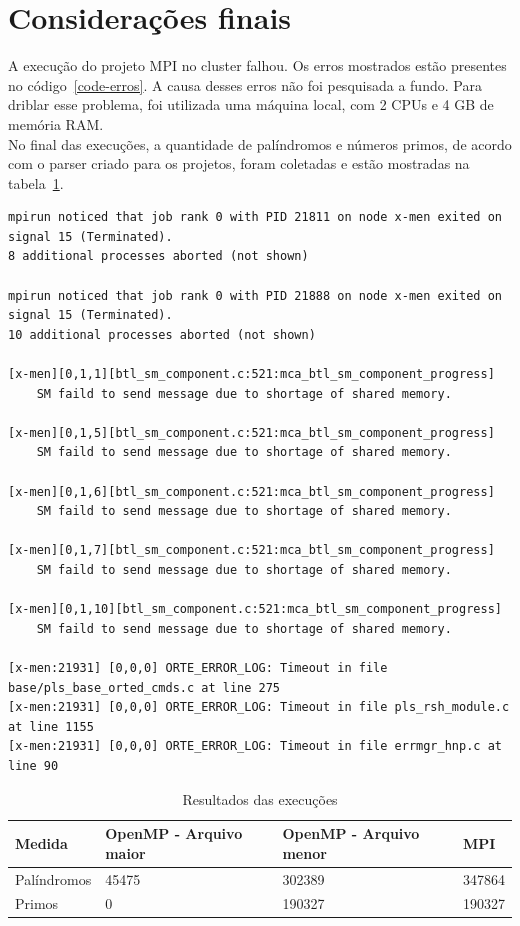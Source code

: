 \documentclass[a4paper]{article}
\begin{document}
\section{Considerações finais}
\indent \indent A execução do projeto MPI no cluster falhou. Os erros mostrados estão presentes no código~\ref{code-erros}. A causa desses erros não foi pesquisada a fundo. Para driblar esse problema, foi utilizada uma máquina local, com 2 CPUs e 4 GB de memória RAM.\\
\indent No final das execuções, a quantidade de palíndromos e números primos, de acordo com o parser criado para os projetos, foram coletadas e estão mostradas na tabela~\ref{table-values}.
\begin{lstlisting}[caption=Erros do MPI no cluster, label=code-erros, float=p]
mpirun noticed that job rank 0 with PID 21811 on node x-men exited on signal 15 (Terminated). 
8 additional processes aborted (not shown)

mpirun noticed that job rank 0 with PID 21888 on node x-men exited on signal 15 (Terminated). 
10 additional processes aborted (not shown)

[x-men][0,1,1][btl_sm_component.c:521:mca_btl_sm_component_progress] 
	SM faild to send message due to shortage of shared memory.

[x-men][0,1,5][btl_sm_component.c:521:mca_btl_sm_component_progress] 
	SM faild to send message due to shortage of shared memory.

[x-men][0,1,6][btl_sm_component.c:521:mca_btl_sm_component_progress] 
	SM faild to send message due to shortage of shared memory.

[x-men][0,1,7][btl_sm_component.c:521:mca_btl_sm_component_progress] 
	SM faild to send message due to shortage of shared memory.

[x-men][0,1,10][btl_sm_component.c:521:mca_btl_sm_component_progress] 
	SM faild to send message due to shortage of shared memory.

[x-men:21931] [0,0,0] ORTE_ERROR_LOG: Timeout in file base/pls_base_orted_cmds.c at line 275
[x-men:21931] [0,0,0] ORTE_ERROR_LOG: Timeout in file pls_rsh_module.c at line 1155
[x-men:21931] [0,0,0] ORTE_ERROR_LOG: Timeout in file errmgr_hnp.c at line 90
\end{lstlisting}
\begin{center} \begin{table}[float=p] \caption{Resultados das execuções} \label{table-values} \begin{tabular}{|l|l|l|l|}
	\hline
	Medida 		& OpenMP - Arquivo maior 	& OpenMP - Arquivo menor 	& MPI \\
	\hline
	Palíndromos	& 45475				& 302389			& 347864 \\
	Primos		& 0				& 190327			& 190327 \\
\hline
\end{tabular} \end{table} \end{center}
\end{document}
